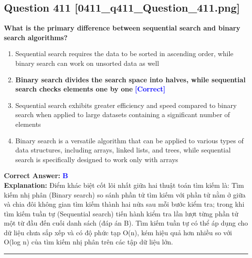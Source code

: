 \documentclass[11pt,a4paper]{article}
\begin{document}
\begin{minipage}{\textwidth}
\subsection*{Question 411 \quad \footnotesize{[0411\_q411\_Question\_411.png]}}
\noindent \textbf{What is the primary difference between sequential search and binary search algorithms?}

\begin{enumerate}[label=\Alph*.]
    \item Sequential search requires the data to be sorted in ascending order, while binary search can work on unsorted data as well
    \item \textbf{Binary search divides the search space into halves, while sequential search checks elements one by one} \hfill \textcolor{blue}{\textbf{[Correct]}}
    \item Sequential search exhibits greater efficiency and speed compared to binary search when applied to large datasets containing a significant number of elements
    \item Binary search is a versatile algorithm that can be applied to various types of data structures, including arrays, linked lists, and trees, while sequential search is specifically designed to work only with arrays
\end{enumerate}

\noindent \textbf{Correct Answer:} \textcolor{blue}{\textbf{B}} \\[2pt]
\noindent \textbf{Explanation:} Điểm khác biệt cốt lõi nhất giữa hai thuật toán tìm kiếm là: Tìm kiếm nhị phân (Binary search) so sánh phần tử tìm kiếm với phần tử nằm ở giữa và chia đôi không gian tìm kiếm thành hai nửa sau mỗi bước kiểm tra; trong khi tìm kiếm tuần tự (Sequential search) tiến hành kiểm tra lần lượt từng phần tử một từ đầu đến cuối danh sách (đáp án B). Tìm kiếm tuần tự có thể áp dụng cho dữ liệu chưa sắp xếp và có độ phức tạp O(n), kém hiệu quả hơn nhiều so với O(log n) của tìm kiếm nhị phân trên các tập dữ liệu lớn.

\par\vspace{0.3cm}
\hrule
\vspace{0.3cm}
\end{minipage}
\end{document}
